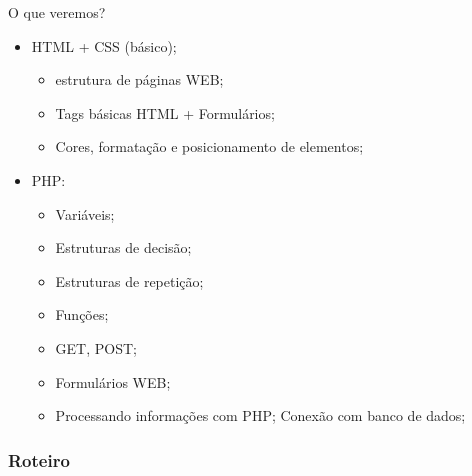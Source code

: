 \documentclass{beamer}
\begin{document}
\begin{frame}{O que veremos?}
  \begin{itemize}
   \item HTML + CSS (básico);
        \begin{itemize}
            \item estrutura de páginas WEB;
            \item Tags básicas HTML + Formulários;
            \item Cores, formatação e posicionamento de elementos;
        \end{itemize}
    \item PHP: 
        \begin{itemize}
            \item Variáveis;
            \item Estruturas de decisão;
            \item Estruturas de repetição;
            \item Funções;
            \item GET, POST;
            \item Formulários WEB;
            \item Processando informações com PHP;
            \ietm Conexão com banco de dados;
        \end{itemize}
  \end{itemize}
\end{frame}

\begin{frame}
\frametitle{Roteiro} %
\tableofcontents %
\end{frame}
\end{document}
